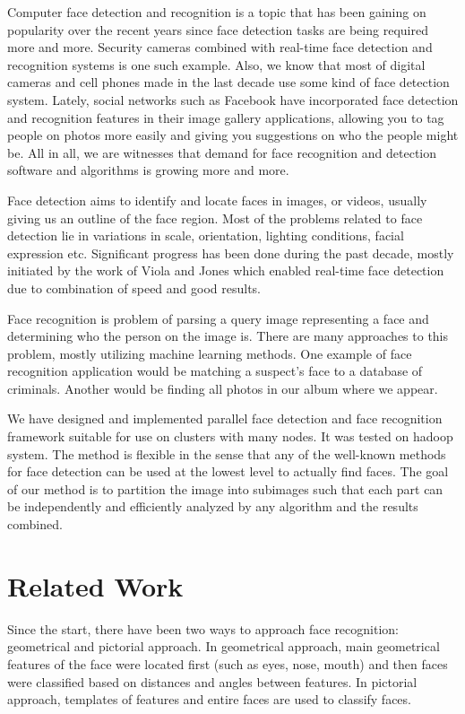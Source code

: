 \documentclass[11pt, draftclsnofoot, onecolumn]{IEEEtran}
\begin{document}
Computer face detection and recognition is a topic that has been gaining on popularity over the recent years since face detection tasks are being required more and more. Security cameras combined with real-time face detection and recognition systems is one such example. Also, we know that most of digital cameras and cell phones made in the last decade use some kind of face detection system. Lately, social networks such as Facebook have incorporated face detection and recognition features in their image gallery applications, allowing you to tag people on photos more easily and giving you suggestions on who the people might be. All in all, we are witnesses that demand for face recognition and detection software and algorithms is growing more and more.

Face detection aims to identify and locate faces in images, or videos, usually giving us an outline of the face region. Most of the problems related to face detection lie in variations in scale, orientation, lighting conditions, facial expression etc. Significant progress has been done during the past decade, mostly initiated by the work of Viola and Jones \cite{IWSCTV2001} which enabled real-time face detection due to combination of speed and good results.

Face recognition is problem of parsing a query image representing a face and determining who the person on the image is. There are many approaches to this problem, mostly utilizing machine learning methods. One example of face recognition application would be matching a suspect's face to a database of criminals. Another would be finding all photos in our album where we appear.

We have designed and implemented parallel face detection and face recognition framework suitable for use on clusters with many nodes. It was tested on hadoop system. The method is flexible in the sense that any of the well-known methods for face detection can be used at the lowest level to actually find faces. The goal of our method is to partition the image into subimages such that each part can be independently and efficiently analyzed by any algorithm and the results combined.

\section{Related Work} \label{sec:related}

Since the start, there have been two ways to approach face recognition: geometrical and pictorial approach. In geometrical approach, main geometrical features of the face were located first (such as eyes, nose, mouth) and then faces were classified based on distances and angles between features. In pictorial approach, templates of features and entire faces are used to classify faces.
\end{document}
